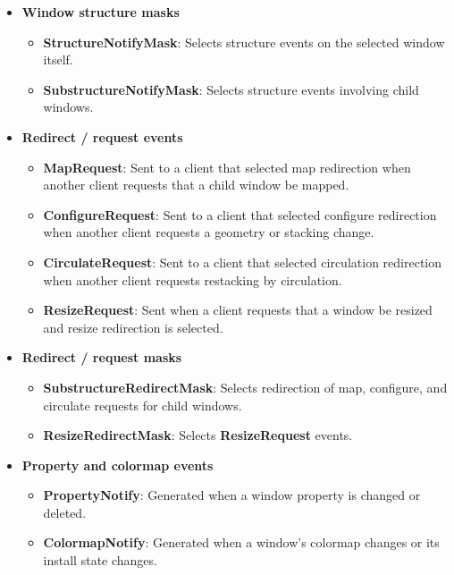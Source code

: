\documentclass{report}
\begin{document}
\begin{itemize}
        \item \textbf{Window structure masks}
            \bigbreak \noindent
            \begin{itemize}
                \item \textbf{StructureNotifyMask}: Selects structure events on the selected window itself.
                \item \textbf{SubstructureNotifyMask}: Selects structure events involving child windows.
            \end{itemize}
        \item \textbf{Redirect / request events}
            \bigbreak \noindent
            \begin{itemize}
                \item \textbf{MapRequest}: Sent to a client that selected map redirection when another client requests that a child window be mapped.
                \item \textbf{ConfigureRequest}: Sent to a client that selected configure redirection when another client requests a geometry or stacking change.
                \item \textbf{CirculateRequest}: Sent to a client that selected circulation redirection when another client requests restacking by circulation.
                \item \textbf{ResizeRequest}: Sent when a client requests that a window be resized and resize redirection is selected.
            \end{itemize}
        \item \textbf{Redirect / request masks}
            \bigbreak \noindent
            \begin{itemize}
                \item \textbf{SubstructureRedirectMask}: Selects redirection of map, configure, and circulate requests for child windows.
                \item \textbf{ResizeRedirectMask}: Selects \textbf{ResizeRequest} events.
            \end{itemize}
        \item \textbf{Property and colormap events}
            \bigbreak \noindent
            \begin{itemize}
                \item \textbf{PropertyNotify}: Generated when a window property is changed or deleted.
                \item \textbf{ColormapNotify}: Generated when a window's colormap changes or its install state changes.

\end{itemize}
\end{itemize}
\end{document}
